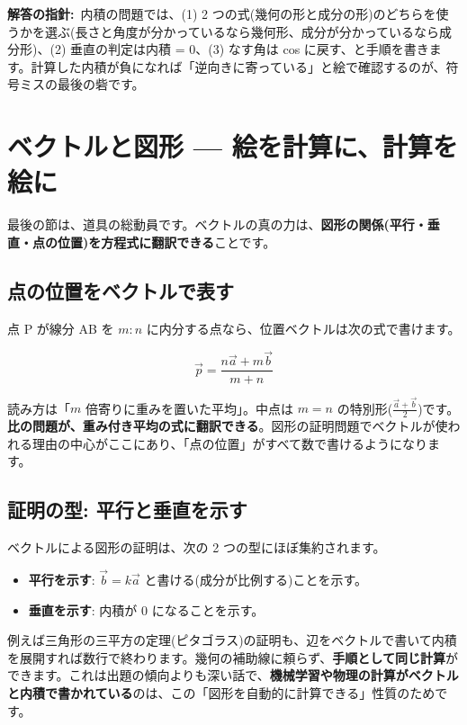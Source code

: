 \documentclass{article}
\begin{document}
\textbf{解答の指針:}\ 内積の問題では、(1) 2 つの式(幾何の形と成分の形)のどちらを使うかを選ぶ(長さと角度が分かっているなら幾何形、成分が分かっているなら成分形)、(2) 垂直の判定は内積 = 0、(3) なす角は cos に戻す、と手順を書きます。計算した内積が負になれば「逆向きに寄っている」と絵で確認するのが、符号ミスの最後の砦です。

\section{ベクトルと図形 — 絵を計算に、計算を絵に}

最後の節は、道具の総動員です。ベクトルの真の力は、\textbf{図形の関係(平行・垂直・点の位置)を方程式に翻訳できる}ことです。

\subsection{点の位置をベクトルで表す}

点 P が線分 AB を \( m : n \) に内分する点なら、位置ベクトルは次の式で書けます。

\[ \vec{p} = \frac{n\vec{a} + m\vec{b}}{m + n} \]

読み方は「\( m \) 倍寄りに重みを置いた平均」。中点は \( m = n \) の特別形(\( \frac{\vec{a} + \vec{b}}{2} \))です。\textbf{比の問題が、重み付き平均の式に翻訳できる}。図形の証明問題でベクトルが使われる理由の中心がここにあり、「点の位置」がすべて数で書けるようになります。

\subsection{証明の型: 平行と垂直を示す}

ベクトルによる図形の証明は、次の 2 つの型にほぼ集約されます。

\begin{itemize}
\item \textbf{平行を示す}: \( \vec{b} = k\vec{a} \) と書ける(成分が比例する)ことを示す。
\item \textbf{垂直を示す}: 内積が 0 になることを示す。
\end{itemize}

例えば三角形の三平方の定理(ピタゴラス)の証明も、辺をベクトルで書いて内積を展開すれば数行で終わります。幾何の補助線に頼らず、\textbf{手順として同じ計算}ができます。これは出題の傾向よりも深い話で、\textbf{機械学習や物理の計算がベクトルと内積で書かれている}のは、この「図形を自動的に計算できる」性質のためです。
\end{document}
